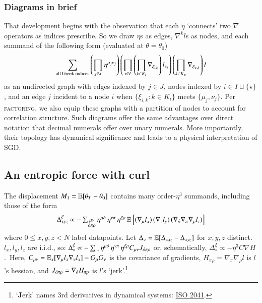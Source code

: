 \subsubsection{Diagrams in brief}\label{sect:diagrams-in-brief}

That development begins with the observation that each $\eta$
`connects' two $\nabla$ operators as indices prescribe.  So we
draw
$\eta$s as edges, $\nabla^k l$s as nodes, and each
summand of the following form (evaluated at $\theta=\theta_0$)
$$
    \sum_{\text{all Greek indices}} \left(\prod_{j\in J} \eta^{\mu_j\nu_j}\right)
    \left(\prod_{i\in I} \left(\prod_{k\in K_i} \nabla_{\xi_{i,k}}\right)
    l_{x_i}\right) \left(\prod_{k\in K_\star} \nabla_{\xi_{\star,k}}\right)
    l
$$
as an undirected graph with edges indexed by $j\in J$, nodes
indexed by $i\in I\sqcup \{\star\}$, and an edge $j$ incident
to a node $i$ when $\{\xi_{i,k}:k\in K_i\}$ meets
$\{\mu_j,\nu_j\}$.  Per \textsc{factoring}, we also equip these
graphs with a partition of nodes to account for correlation
structure.
%
Such diagrams offer the same advantages over direct notation that %
decimal numerals offer over unary numerals.  More importantly,
their topology has dynamical significance and leads to a
physical interpretation of SGD.

\subsection{An entropic force with curl}\label{sect:entropic-curl}
The displacement $M_1=\mathbb{E}[\theta_T - \theta_0]$ contains many
order-$\eta^3$ summands, including those of the form\squash
$$
    \textstyle
    \Delta^\xi_{xyz} \propto 
    -
    \sum_{\substack{\mu\nu    \\ \omicron\pi\rho}}
        \eta^{\mu\omicron} \, \eta^{\nu\pi} \, \eta^{\xi\rho}
        \,
    \expct{
        (\nabla_\mu l_x)
        \,
        (\nabla_\nu l_y)
        \,
        (\nabla_\omicron\nabla_\pi\nabla_\rho l_z)
    }
    \squash
$$
where $0\leq x,y,z<N$ label datapoints.
Let $\Delta_\circ = \mathbb{E}[\Delta_{xxz}-\Delta_{xyz}]$ for $x,y,z$
distinct.\squash\  $l_x, l_y, l_z$ are i.i.d., so:
$ 
    \Delta_\circ^\xi \propto 
    -
    \sum_{\cdots}
    \eta^{\mu{\acute{o}}} \, \eta^{\nu\pi} \, \eta^{\xi\rho}
    C_{\mu\nu} J_{{\acute{o}}\pi\rho}
$
or, schematically, 
    $\boxed{\Delta_\circ^\xi
    \propto -\eta^3 C\nabla H}$.\squish\ 
Here, $C_{\mu\nu} = \mathbb{E}_x[\nabla_{\mu} l_x \nabla_{\nu} l_x] - G_\mu G_\nu$ is the covariance of gradients,
$H_{\pi\rho} = \nabla_\pi\nabla_\rho l$ is $l$'s hessian, and
$J_{{\acute{o}}\pi\rho} = \nabla_{\acute{o}} H_{\pi\rho}$
is $l$'s `jerk'.\footnote{
    `\textbf{J}erk' names $3$rd derivatives in dynamical systems:
    \href{https://www.iso.org/obp/ui/\#iso:std:iso:2041:ed-3:v1:en}{ISO 2041}.%
}

